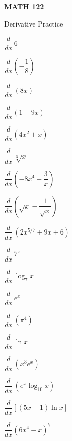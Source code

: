 \documentclass[11pt,letterpaper]{article}
\begin{document}
\begin{center} {\bfseries \Large MATH 122 \par\vspace{0.2cm} \LARGE Derivative Practice} \end{center} \par\vspace{1cm}

\prob
	\begin{2enumerate}
	\item $\dfrac{d}{dx} \, 6$
	\item $\dfrac{d}{dx} \left( -\dfrac{1}{8} \right)$
	\item $\dfrac{d}{dx}\, (8x)$
	\item $\dfrac{d}{dx} (1 - 9x)$
	\item $\dfrac{d}{dx} (4x^2 + x)$
	\item $\dfrac{d}{dx}\, \sqrt[3]{x}$
	\end{2enumerate} \pspace


\vfill


\prob
	\begin{2enumerate}
	\item $\dfrac{d}{dx} \left(-8x^4 + \dfrac{3}{x} \right)$
	\item $\dfrac{d}{dx} \left( \sqrt{x} - \dfrac{1}{\sqrt{x}} \right)$
	\item $\dfrac{d}{dx}\, (2x^{5/7} + 9x + 6)$
	\item $\dfrac{d}{dx}\, 7^x$
	\item $\dfrac{d}{dx}\, \log_7 x$
	\item $\dfrac{d}{dx}\, e^x$
	\end{2enumerate} \pspace


\vfill


\prob
	\begin{2enumerate}
	\item $\dfrac{d}{dx}\, (\pi^4)$
	\item $\dfrac{d}{dx}\, \ln x$
	\item $\dfrac{d}{dx}\, (x^3 e^x)$
	\item $\dfrac{d}{dx}\, (e^x \log_{10} x)$
	\item $\dfrac{d}{dx} \left[ (5x - 1) \ln x \right]$
	\item $\dfrac{d}{dx} (6x^4 - x)^7$
	\end{2enumerate} \vfill



\newpage
\end{document}
